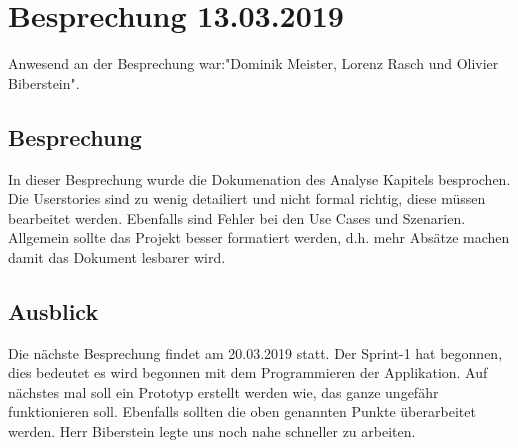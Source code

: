 \documentclass[a4paper,parskip]{scrartcl}
\begin{document}
\section{Besprechung 13.03.2019}
Anwesend an der Besprechung war:"Dominik Meister, Lorenz Rasch und Olivier Biberstein". 
\subsection{Besprechung}
In dieser Besprechung wurde die Dokumenation des Analyse Kapitels besprochen. Die Userstories sind zu wenig detailiert und nicht formal richtig, diese müssen bearbeitet werden. Ebenfalls sind Fehler bei den Use Cases und Szenarien. Allgemein sollte das Projekt besser formatiert werden, d.h. mehr Absätze machen damit das Dokument lesbarer wird.
\subsection{Ausblick}
Die nächste Besprechung findet am 20.03.2019 statt. Der Sprint-1 hat begonnen, dies bedeutet es wird begonnen mit dem Programmieren der Applikation. Auf nächstes mal soll ein Prototyp erstellt werden wie, das ganze ungefähr funktionieren soll. Ebenfalls sollten die oben genannten Punkte überarbeitet werden. Herr Biberstein legte uns noch nahe schneller zu arbeiten. 
\end{document}
